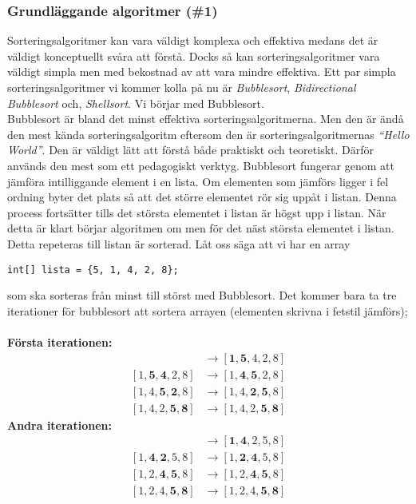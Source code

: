 \documentclass[a4]{article}
\begin{document}
\subsubsection{Grundläggande algoritmer (\#1)}
Sorteringsalgoritmer kan vara väldigt komplexa och effektiva medans det är väldigt konceptuellt svåra att förstå. Docks så kan sorteringsalgoritmer vara väldigt simpla men med bekostnad av att vara mindre effektiva. Ett par simpla sorteringsalgoritmer vi kommer kolla på nu är \textit{Bubblesort}, \textit{Bidirectional Bubblesort} och, \textit{Shellsort}. Vi börjar med Bubblesort.\\
Bubblesort är bland det minst effektiva sorteringsalgoritmerna. Men den är ändå den mest kända sorteringsalgoritm eftersom den är sorteringsalgoritmernas \textit{“Hello World”}. Den är väldigt lätt att förstå både praktiskt och teoretiskt. Därför används den mest som ett pedagogiskt verktyg.\cite{8} Bubblesort fungerar genom att jämföra intilliggande element i en lista. Om elementen som jämförs ligger i fel ordning byter det plats så att det större elementet rör sig uppåt i listan. Denna process fortsätter tills det största elementet i listan är högst upp i listan. När detta är klart börjar algoritmen om men för det näst största elementet i listan. Detta repeteras till listan är sorterad. Låt oss säga att vi har en array 
\begin{lstlisting}[style=mystyle, numbers=none]
 int[] lista = {5, 1, 4, 2, 8};
\end{lstlisting}
som ska sorteras från minst till störst med Bubblesort. Det kommer bara ta tre iterationer för bubblesort att sortera arrayen (elementen skrivna i fetstil jämförs);\\\\
\textbf{Första iterationen:}
\begin{align*}
    [\textbf{5}, \textbf{1}, 4, 2, 8] &\rightarrow [\textbf{1}, \textbf{5}, 4, 2, 8]\\
    [1, \textbf{5}, \textbf{4}, 2, 8] &\rightarrow [1, \textbf{4}, \textbf{5}, 2, 8]\\
    [1, 4, \textbf{5}, \textbf{2}, 8] &\rightarrow [1, 4, \textbf{2}, \textbf{5}, 8]\\
    [1, 4, 2, \textbf{5}, \textbf{8}] &\rightarrow [1, 4, 2, \textbf{5}, \textbf{8}]
\end{align*}
\textbf{Andra iterationen:}
\begin{align*}
    [\textbf{1}, \textbf{4}, 2, 5, 8] &\rightarrow [\textbf{1}, \textbf{4}, 2, 5, 8]\\
    [1, \textbf{4}, \textbf{2}, 5, 8] &\rightarrow [1, \textbf{2}, \textbf{4}, 5, 8]\\
    [1, 2, \textbf{4}, \textbf{5}, 8] &\rightarrow [1, 2, \textbf{4}, \textbf{5}, 8]\\
    [1, 2, 4, \textbf{5}, \textbf{8}] &\rightarrow [1, 2, 4, \textbf{5}, \textbf{8}]
\end{align*}
\end{document}
